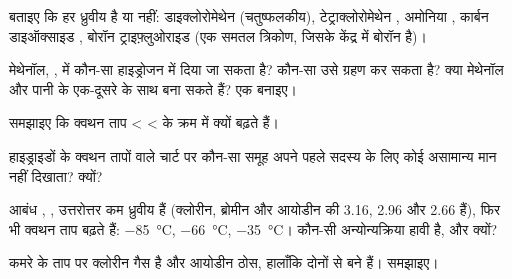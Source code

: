 \begin{exercise}[$\star\star$]\label{exo:g11:polarity-and-cohesion:6}
बताइए कि हर  ध्रुवीय है या नहीं: डाइक्लोरोमेथेन 
(चतुष्फलकीय), टेट्राक्लोरोमेथेन , अमोनिया , कार्बन
डाइऑक्साइड , बोरॉन ट्राइफ़्लुओराइड  (एक समतल त्रिकोण, जिसके
केंद्र में बोरॉन है)।
\end{exercise}

\begin{exercise}[$\star\star$]\label{exo:g11:polarity-and-cohesion:7}
मेथेनॉल, , में कौन-सा हाइड्रोजन   में दिया जा सकता
है? कौन-सा  उसे ग्रहण कर सकता है? क्या मेथेनॉल और पानी के  एक-दूसरे के
साथ  बना सकते हैं? एक बनाइए।
\end{exercise}

\begin{exercise}[$\star\star$]\label{exo:g11:polarity-and-cohesion:8}
समझाइए कि क्वथन ताप  <
 <  के क्रम में क्यों बढ़ते हैं।
\end{exercise}

\begin{exercise}[$\star\star$]\label{exo:g11:polarity-and-cohesion:9}
हाइड्राइडों के क्वथन तापों वाले चार्ट पर कौन-सा समूह अपने पहले सदस्य के लिए कोई
असामान्य मान नहीं दिखाता? क्यों?
\end{exercise}

\begin{exercise}[$\star\star$]\label{exo:g11:polarity-and-cohesion:10}
आबंध , ,  उत्तरोत्तर कम ध्रुवीय हैं (क्लोरीन,
ब्रोमीन और आयोडीन की  3.16, 2.96 और
2.66 हैं), फिर भी क्वथन ताप बढ़ते हैं: \qty{-85}{\celsius},
\qty{-66}{\celsius}, \qty{-35}{\celsius}। कौन-सी अन्योन्यक्रिया हावी है, और
क्यों?
\end{exercise}

\begin{exercise}[$\star\star$]\label{exo:g11:polarity-and-cohesion:11}
कमरे के ताप पर क्लोरीन गैस है और आयोडीन ठोस, हालाँकि दोनों
  से बने हैं। समझाइए।
\end{exercise}

